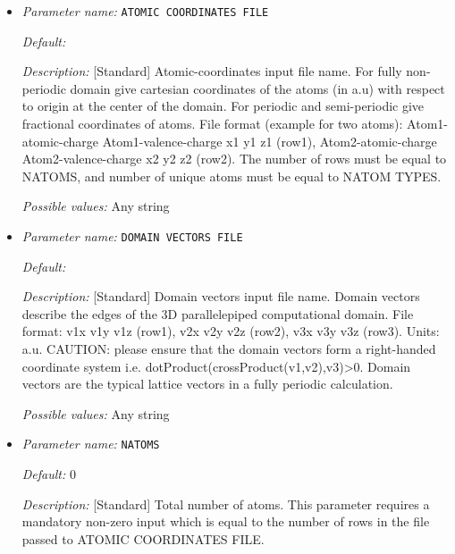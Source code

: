\begin{itemize}
\item {\it Parameter name:} {\tt ATOMIC COORDINATES FILE}
\label{parameters:Geometry/ATOMIC COORDINATES FILE}
\label{parameters:Geometry/ATOMIC_20COORDINATES_20FILE}




{\it Default:} 


{\it Description:} [Standard] Atomic-coordinates input file name. For fully non-periodic domain give cartesian coordinates of the atoms (in a.u) with respect to origin at the center of the domain. For periodic and semi-periodic give fractional coordinates of atoms. File format (example for two atoms): Atom1-atomic-charge Atom1-valence-charge x1 y1 z1 (row1), Atom2-atomic-charge Atom2-valence-charge x2 y2 z2 (row2). The number of rows must be equal to NATOMS, and number of unique atoms must be equal to NATOM TYPES.


{\it Possible values:} Any string
\item {\it Parameter name:} {\tt DOMAIN VECTORS FILE}
\label{parameters:Geometry/DOMAIN VECTORS FILE}
\label{parameters:Geometry/DOMAIN_20VECTORS_20FILE}




{\it Default:} 


{\it Description:} [Standard] Domain vectors input file name. Domain vectors describe the edges of the 3D parallelepiped computational domain. File format: v1x v1y v1z (row1), v2x v2y v2z (row2), v3x v3y v3z (row3). Units: a.u. CAUTION: please ensure that the domain vectors form a right-handed coordinate system i.e. dotProduct(crossProduct(v1,v2),v3)>0. Domain vectors are the typical lattice vectors in a fully periodic calculation.


{\it Possible values:} Any string
\item {\it Parameter name:} {\tt NATOMS}
\label{parameters:Geometry/NATOMS}




{\it Default:} 0


{\it Description:} [Standard] Total number of atoms. This parameter requires a mandatory non-zero input which is equal to the number of rows in the file passed to ATOMIC COORDINATES FILE.



\end{itemize}

